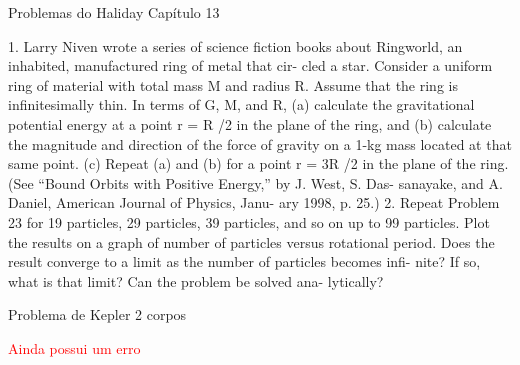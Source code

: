 Problemas do Haliday Capítulo 13

1. Larry Niven wrote a series of science fiction books about
Ringworld, an inhabited, manufactured ring of metal that cir-
cled a star. Consider a uniform ring of material with total
mass M and radius R. Assume that the ring is infinitesimally
thin. In terms of G, M, and R, (a) calculate the gravitational
potential energy at a point r = R /2 in the plane of the ring,
and (b) calculate the magnitude and direction of the force of
gravity on a 1-kg mass located at that same point. (c) Repeat
(a) and (b) for a point r = 3R /2 in the plane of the ring. (See
“Bound Orbits with Positive Energy,” by J. West, S. Das-
sanayake, and A. Daniel, American Journal of Physics, Janu-
ary 1998, p. 25.)
2. Repeat Problem 23 for 19 particles, 29 particles, 39 particles,
and so on up to 99 particles. Plot the results on a graph of
number of particles versus rotational period. Does the result
converge to a limit as the number of particles becomes infi-
nite? If so, what is that limit? Can the problem be solved ana-
lytically?

Problema de Kepler 2 corpos

\textcolor{red}{Ainda possui um erro}

